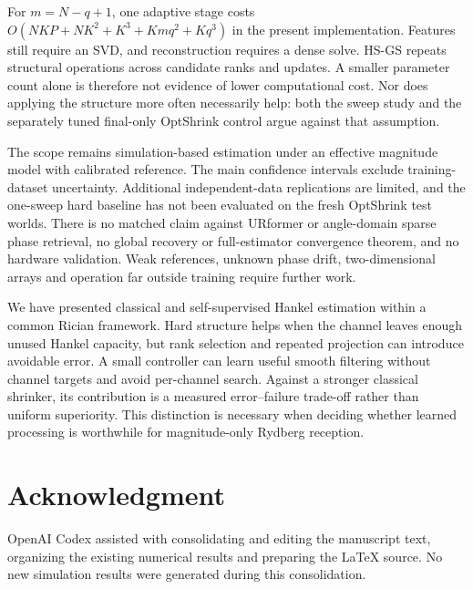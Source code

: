 \documentclass[10pt,journal,letterpaper]{IEEEtran}
\begin{document}
For $m=N-q+1$, one adaptive stage costs $O(NKP+NK^2+K^3+Kmq^2+Kq^3)$ in the present implementation. Features still require an SVD, and reconstruction requires a dense solve. HS-GS repeats structural operations across candidate ranks and updates. A smaller parameter count alone is therefore not evidence of lower computational cost. Nor does applying the structure more often necessarily help: both the sweep study and the separately tuned final-only OptShrink control argue against that assumption.

The scope remains simulation-based estimation under an effective magnitude model with calibrated reference. The main confidence intervals exclude training-dataset uncertainty. Additional independent-data replications are limited, and the one-sweep hard baseline has not been evaluated on the fresh OptShrink test worlds. There is no matched claim against URformer or angle-domain sparse phase retrieval, no global recovery or full-estimator convergence theorem, and no hardware validation. Weak references, unknown phase drift, two-dimensional arrays and operation far outside training require further work.

We have presented classical and self-supervised Hankel estimation within a common Rician framework. Hard structure helps when the channel leaves enough unused Hankel capacity, but rank selection and repeated projection can introduce avoidable error. A small controller can learn useful smooth filtering without channel targets and avoid per-channel search. Against a stronger classical shrinker, its contribution is a measured error--failure trade-off rather than uniform superiority. This distinction is necessary when deciding whether learned processing is worthwhile for magnitude-only Rydberg reception.

\section*{Acknowledgment}
OpenAI Codex assisted with consolidating and editing the manuscript text, organizing the existing numerical results and preparing the LaTeX source. No new simulation results were generated during this consolidation.



\end{document}
